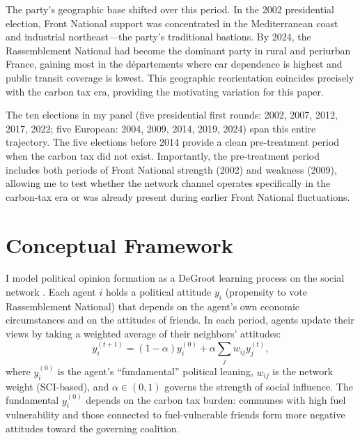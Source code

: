 \documentclass[12pt]{article}
\newcommand{\rn}{Rassemblement National}
\newcommand{\fn}{Front National}
\newcommand{\depts}{d\'{e}partements}
\begin{document}
The party's geographic base shifted over this period. In the 2002 presidential election, \fn{} support was concentrated in the Mediterranean coast and industrial northeast---the party's traditional bastions. By 2024, the \rn{} had become the dominant party in rural and periurban France, gaining most in the \depts{} where car dependence is highest and public transit coverage is lowest. This geographic reorientation coincides precisely with the carbon tax era, providing the motivating variation for this paper.

The ten elections in my panel (five presidential first rounds: 2002, 2007, 2012, 2017, 2022; five European: 2004, 2009, 2014, 2019, 2024) span this entire trajectory. The five elections before 2014 provide a clean pre-treatment period when the carbon tax did not exist. Importantly, the pre-treatment period includes both periods of \fn{} strength (2002) and weakness (2009), allowing me to test whether the network channel operates specifically in the carbon-tax era or was already present during earlier \fn{} fluctuations.



\section{Conceptual Framework}
\label{sec:framework}

I model political opinion formation as a DeGroot learning process on the social network \citep{degroot1974reaching, golub2010naive}. Each agent $i$ holds a political attitude $y_i$ (propensity to vote \rn{}) that depends on the agent's own economic circumstances and on the attitudes of friends. In each period, agents update their views by taking a weighted average of their neighbors' attitudes:
\begin{equation}
y_i^{(t+1)} = (1 - \alpha) y_i^{(0)} + \alpha \sum_j w_{ij} y_j^{(t)},
\label{eq:degroot}
\end{equation}
where $y_i^{(0)}$ is the agent's ``fundamental'' political leaning, $w_{ij}$ is the network weight (SCI-based), and $\alpha \in (0,1)$ governs the strength of social influence. The fundamental $y_i^{(0)}$ depends on the carbon tax burden: communes with high fuel vulnerability and those connected to fuel-vulnerable friends form more negative attitudes toward the governing coalition.
\end{document}
